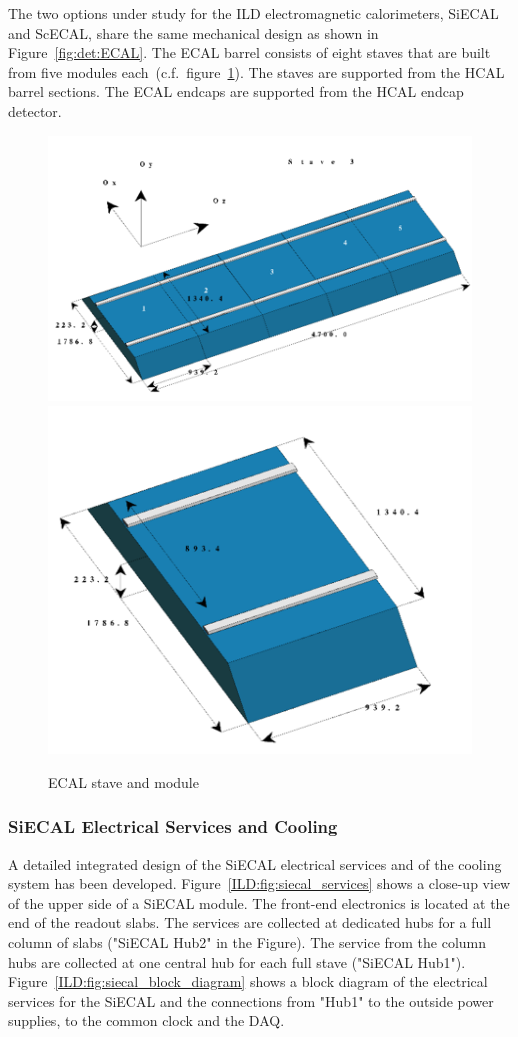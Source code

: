 The two options under study for the ILD electromagnetic calorimeters, SiECAL and ScECAL, share the same mechanical design as shown in Figure~\ref{fig:det:ECAL}. The ECAL barrel consists of eight staves that are built from five modules each~(c.f.~figure~\ref{ILD:fig:ECAL_Mechanics}). The staves are supported from the HCAL barrel sections. The ECAL endcaps are supported from the HCAL endcap detector.
\begin{figure}[h]
    \centering
        \includegraphics[width=0.5\hsize]{Integration/fig/ECAL_Stave.png}
        \includegraphics[width=0.3\hsize]{Integration/fig/ECAL_Module.png}
    \caption{ECAL stave and module~\cite{ild:bib:SiECAL_ICD}}
    \label{ILD:fig:ECAL_Mechanics}
\end{figure}

\subsubsection{SiECAL Electrical Services and Cooling}

A detailed integrated design of the SiECAL electrical services and of the cooling system has been developed. Figure~\ref{ILD:fig:siecal_services} shows a close-up view of the upper side of a SiECAL module. The front-end electronics is located at the end of the readout slabs. The services are collected at dedicated hubs for a full column of slabs ("SiECAL Hub2" in the Figure). The service from the column hubs are collected at one central hub for each full stave ("SiECAL Hub1"). Figure~\ref{ILD:fig:siecal_block_diagram} shows a block diagram of the electrical services for the SiECAL and the connections from "Hub1" to the outside power supplies, to the common clock and the DAQ. 

